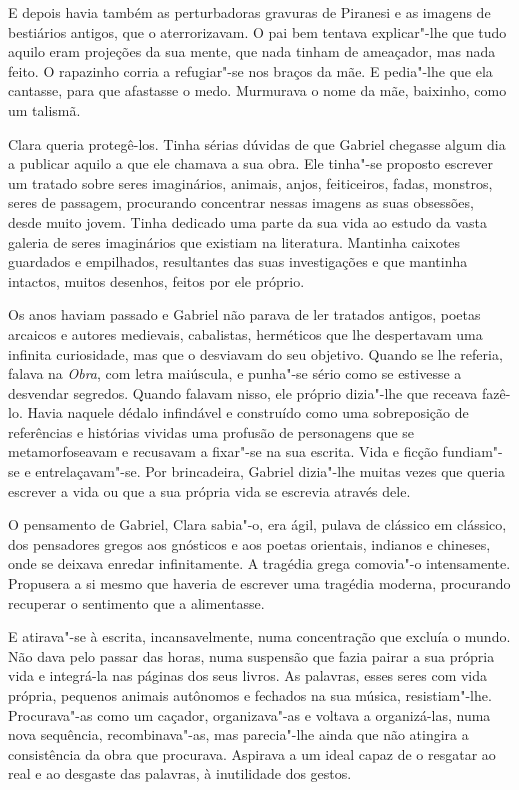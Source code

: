 E depois havia também as perturbadoras gravuras de Piranesi e as imagens
de bestiários antigos, que o aterrorizavam. O pai bem tentava
explicar"-lhe que tudo aquilo eram projeções da sua mente, que nada
tinham de ameaçador, mas nada feito. O rapazinho corria a refugiar"-se
nos braços da mãe. E pedia"-lhe que ela cantasse, para que afastasse o
medo. Murmurava o nome da mãe, baixinho, como um talismã.

Clara queria protegê-los. Tinha sérias dúvidas de que Gabriel chegasse
algum dia a publicar aquilo a que ele chamava a sua obra. Ele tinha"-se
proposto escrever um tratado sobre seres imaginários, animais, anjos,
feiticeiros, fadas, monstros, seres de passagem, procurando concentrar
nessas imagens as suas obsessões, desde muito jovem. Tinha dedicado uma
parte da sua vida ao estudo da vasta galeria de seres imaginários que
existiam na literatura. Mantinha caixotes guardados e empilhados,
resultantes das suas investigações e que mantinha intactos, muitos
desenhos, feitos por ele próprio.

Os anos haviam passado e Gabriel não parava de ler tratados antigos,
poetas arcaicos e autores medievais, cabalistas, herméticos que lhe
despertavam uma infinita curiosidade, mas que o desviavam do seu
objetivo. Quando se lhe referia, falava na \emph{Obra}, com letra
maiúscula, e punha"-se sério como se estivesse a desvendar segredos.
Quando falavam nisso, ele próprio dizia"-lhe que receava fazê-lo. Havia
naquele dédalo infindável e construído como uma sobreposição de
referências e histórias vividas uma profusão de personagens que se
metamorfoseavam e recusavam a fixar"-se na sua escrita. Vida e ficção
fundiam"-se e entrelaçavam"-se. Por brincadeira, Gabriel dizia"-lhe muitas
vezes que queria escrever a vida ou que a sua própria vida se escrevia
através dele.

O pensamento de Gabriel, Clara sabia"-o, era ágil, pulava de clássico em
clássico, dos pensadores gregos aos gnósticos e aos poetas orientais,
indianos e chineses, onde se deixava enredar infinitamente. A tragédia
grega comovia"-o intensamente. Propusera a si mesmo que haveria de
escrever uma tragédia moderna, procurando recuperar o sentimento que a
alimentasse.

E atirava"-se à escrita, incansavelmente, numa concentração que excluía o
mundo. Não dava pelo passar das horas, numa suspensão que fazia pairar a
sua própria vida e integrá-la nas páginas dos seus livros. As palavras,
esses seres com vida própria, pequenos animais autônomos e fechados na
sua música, resistiam"-lhe. Procurava"-as como um caçador, organizava"-as e
voltava a organizá-las, numa nova sequência, recombinava"-as, mas
parecia"-lhe ainda que não atingira a consistência da obra que procurava.
Aspirava a um ideal capaz de o resgatar ao real e ao desgaste das
palavras, à inutilidade dos gestos.

